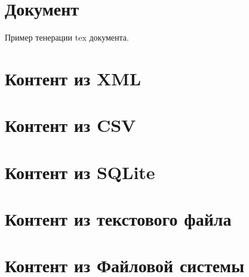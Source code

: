 \documentclass[12pt,a4paper]{scrartcl}
\begin{document}
\section{Документ}
Пример тенерации tex документа.

\section{Контент из XML}


\section{Контент из CSV}


\section{Контент из SQLite}


\section{Контент из текстового файла}


\section{Контент из Файловой системы}

\end{document}
